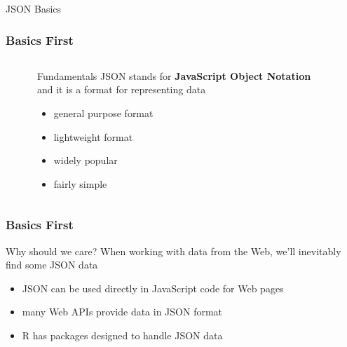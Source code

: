 \documentclass{beamer}\usepackage[]{graphicx}\usepackage[]{color}
\begin{document}

\begin{frame}
 \begin{center}
  \Huge{\textcolor{mandarina}{JSON Basics}}
 \end{center}
\end{frame}


\begin{frame}
\frametitle{Basics First}

\begin{columns}[t]
\begin{column}{0.1\textwidth}
\end{column}
\begin{column}{0.7\textwidth}

\begin{block}{Fundamentals}
JSON stands for \textbf{JavaScript Object Notation} \\
and it is a format for representing data
 \begin{itemize}
  \item general purpose format
  \item lightweight format
  \item widely popular
  \item fairly simple
 \end{itemize}
\end{block}

\end{column}
\begin{column}{0.1\textwidth}
\end{column}
\end{columns}

\end{frame}


\begin{frame}
\frametitle{Basics First}

\begin{block}{Why should we care?}
When working with data from the Web, we'll inevitably find some JSON data
\begin{itemize}
 \item JSON can be used directly in JavaScript code for Web pages
 \item many Web APIs provide data in JSON format
 \item R has packages designed to handle JSON data
\end{itemize}
\end{block}

\end{frame}
\end{document}
